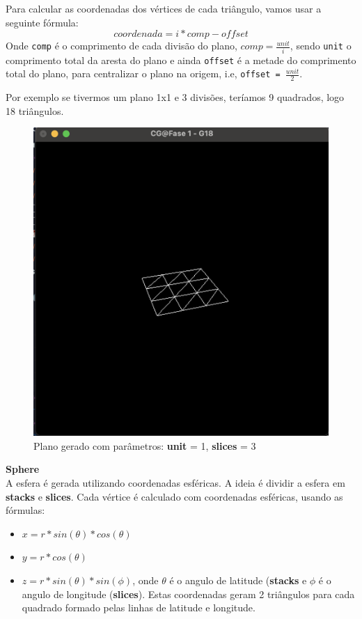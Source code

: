 \documentclass[12pt,a4paper]{report}%
\begin{document}
Para calcular as coordenadas dos vértices de cada triângulo, vamos usar a seguinte fórmula: 
\[coordenada = i*comp-offset\]
Onde \texttt{comp} é o comprimento de cada divisão do plano, \(comp = \frac{unit}{i} \), sendo \texttt{unit} o comprimento total da aresta do plano e ainda \texttt{offset} é a metade do comprimento total do plano, para centralizar o plano na origem, i.e, \texttt{offset = }\(\frac{unit}{2} \).

Por exemplo se tivermos um plano 1x1 e 3 divisões, teríamos 9 quadrados, logo 18 triângulos.

\begin{figure} [H]
    \centering
    \includegraphics[width=0.5\linewidth]{images/plane_1_3.png}
    \caption{Plano gerado com parâmetros: \textbf{unit} = 1, \textbf{slices} = 3}
    \label{fig:plane-13}
\end{figure}



\textbf{Sphere} \\

A esfera é gerada utilizando coordenadas esféricas. A ideia é dividir a esfera em \textbf{stacks} e \textbf{slices}. 
Cada vértice é calculado com coordenadas esféricas, usando as fórmulas:
\begin{itemize}
    \item \(x = r * sin(\theta) * cos(\theta)\)
    \item \(y = r * cos(\theta)\)
    \item \(z = r * sin(\theta) * sin(\phi)\), onde \(\theta\) é o angulo de latitude (\textbf{stacks} e \(\phi\) é o angulo de longitude (\textbf{slices}). Estas coordenadas geram 2 triângulos para cada quadrado formado pelas linhas de latitude e longitude.
\end{itemize}
\end{document}

